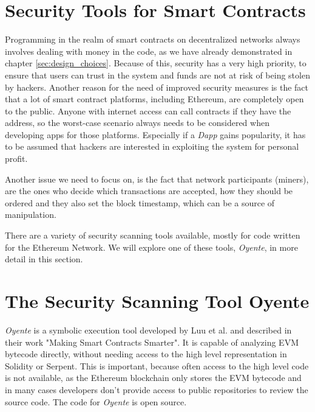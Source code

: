 \section{Security Tools for Smart Contracts}
Programming in the realm of smart contracts on decentralized networks always involves dealing with money in the code, as we have already demonstrated in chapter \ref{sec:design_choices}. Because of this, security has a very high priority, to ensure that users can trust in the system and funds are not at risk of being stolen by hackers. Another reason for the need of improved security measures is the fact that a lot of smart contract platforms, including Ethereum, are completely open to the public. Anyone with internet access can call contracts if they have the address, so the worst-case scenario always needs to be considered when developing apps for those platforms. Especially if a \emph{Dapp} gains popularity, it has to be assumed that hackers are interested in exploiting the system for personal profit.

Another issue we need to focus on, is the fact that network participants (miners), are the ones who decide which transactions are accepted, how they should be ordered and they also set the block timestamp, which can be a source of manipulation.

There are a variety of security scanning tools available, mostly for code written for the Ethereum Network. We will explore one of these tools, \emph{Oyente}, in more detail in this section.

\section*{The Security Scanning Tool Oyente}

\emph{Oyente} is a symbolic execution tool developed by Luu et al. and described in their work "Making Smart Contracts Smarter"\cite{luu2016making}. It is capable of analyzing EVM bytecode directly, without needing access to the high level representation in Solidity or Serpent. This is important, because often access to the high level code is not available, as the Ethereum blockchain only stores the EVM bytecode and in many cases developers don't provide access to public repositories to review the source code. The code for \emph{Oyente} is open source.

